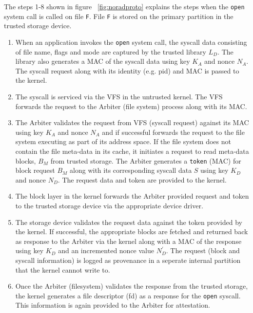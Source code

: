 \documentclass[withindex,glossary]{cam-thesis}
\begin{document}
The steps 1-8 shown in figure ~\ref{fig:noradproto} explains the steps when the \texttt{open} system call is called on file \texttt{F}.
File \texttt{F} is stored on the primary partition in the trusted storage device.

\begin{enumerate}[Step 1:]

\item When an application invokes the \texttt{open} system call, the syscall data consisting of file name, flags and mode are captured by the trusted library $L_D$.
The library also generates a MAC of the syscall data using key $K_A$ and nonce $N_A$.
The syscall request along with its identity (e.g. pid) and MAC is passed to the kernel.

\item The syscall is serviced via the VFS in the untrusted kernel. The VFS forwards the request to the Arbiter (file system) process along with its MAC.

\item The Arbiter validates the request from VFS (syscall request) against its MAC using key $K_A$ and nonce $N_A$ and if successful forwards the request to the file system executing as part of its address space.
If the file system does not contain the file meta-data in its cache, it initiates a request to read meta-data blocks, $B_M$ from trusted storage.
The Arbiter generates a \texttt{token} (MAC) for block request $B_M$ along with its corresponding syscall data $S$ using key $K_D$ and nonce $N_D$.
The request data and token are provided to the kernel.

\item The block layer in the kernel forwards the Arbiter provided request and token to the trusted storage device via the appropriate device driver.

\item The storage device validates the request data against the token provided by the kernel.
If successful, the appropriate blocks are fetched and returned back as response to the Arbiter via the kernel along with a MAC of the response using key $K_D$ and an incremented nonce value $N^\prime_D$.
The request (block and syscall information) is logged as provenance in a seperate internal partition that the kernel cannot write to.

\item Once the Arbiter (filesystem) validates the response from the trusted storage, the kernel generates a file descriptor (fd) as a response for the \texttt{open} syscall.
This information is again provided to the Arbiter for attestation.


\end{enumerate}
\end{document}
